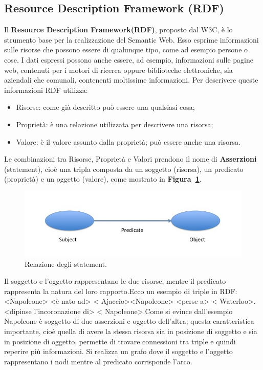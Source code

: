 \documentclass[a4paper,11pt]{article}
\begin{document}
\subsection{Resource Description Framework (RDF)}
\label{sec:2.2}
Il \textbf{Resource Description Framework(RDF)}, proposto dal W3C, è lo strumento base per la realizzazione del Semantic Web. Esso esprime informazioni sulle risorse che possono essere di qualunque tipo, come ad esempio persone o cose.\newline
I dati espressi possono anche essere, ad esempio, informazioni sulle pagine web, contenuti per i motori di ricerca oppure biblioteche elettroniche, sia aziendali che comunali, contenenti moltissime informazioni.
Per descrivere queste informazioni RDF utilizza:
\begin{itemize}
	\item Risorse: come già descritto può essere una qualsiasi cosa;
	\item Proprietà: è una relazione utilizzata per descrivere una risorsa;
	\item Valore: è il valore assunto dalla proprietà; può essere anche una risorsa.
\end{itemize}
Le combinazioni tra Risorse, Proprietà e Valori prendono il nome di \textbf{Asserzioni} (statement), cioè una tripla composta da un soggetto (risorsa), un predicato (proprietà) e un oggetto (valore), come mostrato in \textbf{Figura~\ref{fig:3}}.

\begin{figure}[htbp]
	\centering
	\includegraphics[scale=0.5]{Assertion.jpg}
	\caption{Relazione degli statement.}
	\label{fig:3}
\end{figure}\newpage 

Il soggetto e l'oggetto rappresentano le due risorse, mentre il predicato rappresenta la natura del loro rapporto.\newline Ecco un esempio di triple in RDF:\newline <Napoleone> <è nato ad> < Ajaccio>\newline <Napoleone> <perse a> < Waterloo>. <dipinse l'incoronazione di> < Napoleone>.\newline Come si evince dall'esempio Napoleone è soggetto di due asserzioni e oggetto dell'altra; questa caratteristica importante, cioè quella di avere la stessa risorsa sia in posizione di soggetto e sia in posizione di oggetto, permette di trovare connessioni tra triple e quindi reperire più informazioni.
Si realizza un grafo dove il soggetto e l'oggetto rappresentano i nodi mentre al predicato corrisponde l'arco.
\end{document}

